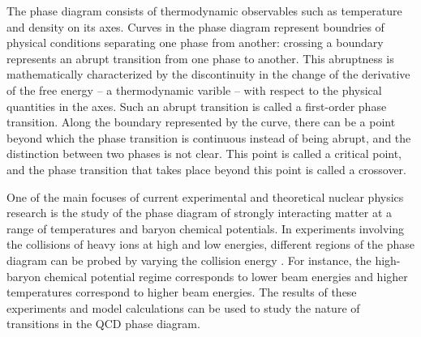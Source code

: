 The phase diagram consists of thermodynamic observables such as temperature and density on its axes. Curves in the phase diagram represent boundries of physical conditions separating one phase from another: crossing a boundary represents an abrupt transition from one phase to another. This abruptness is mathematically characterized by the discontinuity in the change of the derivative of the free energy -- a thermodynamic varible -- with respect to the physical quantities in the axes. Such an abrupt transition is called a first-order phase transition. Along the boundary represented by the curve, there can be a point beyond which the phase transition is continuous instead of being abrupt, and the distinction between two phases is not clear. This point is called a critical point, and the phase transition that takes place beyond this point is called a crossover. %

One of the main focuses of current experimental and theoretical nuclear physics research is the study of the phase diagram of strongly interacting matter at a range of temperatures and baryon chemical potentials. In experiments involving the collisions of heavy ions at high and low energies, different regions of the phase diagram can be probed by varying the collision energy \cite{PhysRevC.93.024901}. For instance, the high-baryon chemical potential regime corresponds to lower beam energies and higher temperatures correspond to higher beam energies. The results of these experiments and model calculations can be used to study the nature of transitions in the QCD phase diagram.

